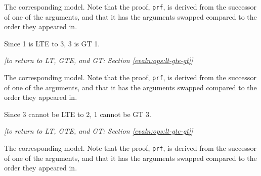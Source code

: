     \newpage
    
    
    
    The corresponding \Idris model. Note that the proof, \texttt{prf}, is derived from the successor of one of the arguments, and that it has the arguments swapped compared to the order they appeared in.
    
    
    Since 1 is LTE to 3, 3 is GT 1.
    \\
    
    \begin{flushright}
        \textit{[to return to LT, GTE, and GT: Section \ref{evaln:ops:lt-gte-gt}]}
    \end{flushright}
    
    \newpage
    
    
    
    The corresponding \Idris model. Note that the proof, \texttt{prf}, is derived from the successor of one of the arguments, and that it has the arguments swapped compared to the order they appeared in.
    
    
    Since 3 cannot be LTE to 2, 1 cannot be GT 3.
    \\
    
    \begin{flushright}
        \textit{[to return to LT, GTE, and GT: Section \ref{evaln:ops:lt-gte-gt}]}
    \end{flushright}
    
    \newpage
    
    
    
    The corresponding \Idris model. Note that the proof, \texttt{prf}, is derived from the successor of one of the arguments, and that it has the arguments swapped compared to the order they appeared in.
    
